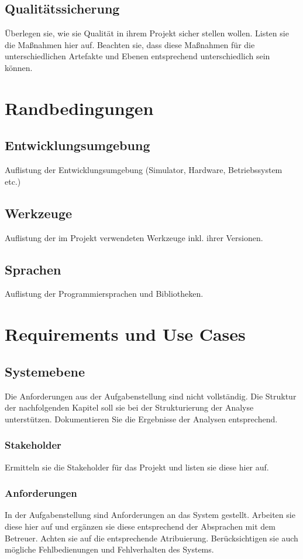 \documentclass[
   draft=false
  ,paper=a4
  ,twoside=true
  ,fontsize=11pt
  ,headsepline
  ,DIV11
  ,parskip=full+
]{scrartcl} %
\begin{document}
\subsection{Qualitätssicherung}
Überlegen sie, wie sie Qualität in ihrem Projekt sicher stellen wollen. Listen sie die Maßnahmen hier auf. Beachten sie, dass diese Maßnahmen für die unterschiedlichen Artefakte und Ebenen entsprechend unterschiedlich sein können.
\newpage
\section{Randbedingungen}
\subsection{Entwicklungsumgebung}
Auflistung der Entwicklungsumgebung (Simulator, Hardware, Betriebssystem etc.)
\subsection{Werkzeuge}
Auflistung der im Projekt verwendeten Werkzeuge inkl. ihrer Versionen.
\subsection{Sprachen}
Auflistung der Programmiersprachen und Bibliotheken.
\newpage
\section{Requirements und Use Cases}
\subsection{Systemebene}
Die Anforderungen aus der Aufgabenstellung sind nicht vollständig. Die Struktur der nachfolgenden Kapitel soll sie bei der Strukturierung der Analyse unterstützen. Dokumentieren Sie die Ergebnisse der Analysen entsprechend.
\subsubsection{Stakeholder}
Ermitteln sie die Stakeholder für das Projekt und listen sie diese hier auf.
\subsubsection{Anforderungen}
In der Aufgabenstellung sind Anforderungen an das System gestellt. Arbeiten sie diese hier auf und ergänzen sie diese entsprechend der Absprachen mit dem Betreuer. Achten sie auf die entsprechende Atribuierung. 
Berücksichtigen sie auch mögliche Fehlbedienungen und Fehlverhalten des Systems.
\end{document}
